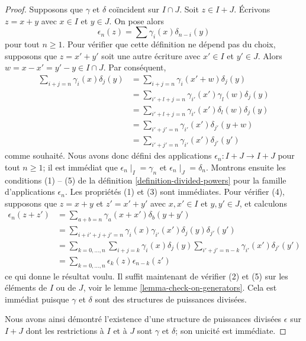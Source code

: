 \begin{proof}
\medskip\noindent
Supposons que $\gamma$ et $\delta$ coïncident sur $I \cap J$.
Soit $z \in I + J$. Écrivons $z = x + y$ avec $x \in I$ et $y \in J$.
On pose alors
$$
\epsilon_n(z) = \sum \gamma_i(x)\delta_{n - i}(y)
$$
pour tout $n \geq 1$.
Pour vérifier que cette définition ne dépend pas du choix, supposons que
$z = x' + y'$ soit une autre écriture avec $x' \in I$ et $y' \in J$. Alors
$w = x - x' = y' - y \in I \cap J$. Par conséquent,
\begin{align*}
\sum\nolimits_{i + j = n} \gamma_i(x)\delta_j(y)
& =
\sum\nolimits_{i + j = n} \gamma_i(x' + w)\delta_j(y) \\
& =
\sum\nolimits_{i' + l + j = n} \gamma_{i'}(x')\gamma_l(w)\delta_j(y) \\
& =
\sum\nolimits_{i' + l + j = n} \gamma_{i'}(x')\delta_l(w)\delta_j(y) \\
& =
\sum\nolimits_{i' + j' = n} \gamma_{i'}(x')\delta_{j'}(y + w) \\
& =
\sum\nolimits_{i' + j' = n} \gamma_{i'}(x')\delta_{j'}(y')
\end{align*}
comme souhaité. Nous avons donc défini des applications
$\epsilon_n : I + J \to I + J$ pour tout $n \geq 1$; il est immédiat que
$\epsilon_n \mid_{I} = \gamma_n$ et
$\epsilon_n \mid_{J} = \delta_n$.
Montrons ensuite les conditions (1) -- (5) de la définition
\ref{definition-divided-powers} pour la famille d'applications $\epsilon_n$.
Les propriétés (1) et (3) sont immédiates. Pour vérifier (4), supposons
que $z = x + y$ et $z' = x' + y'$ avec $x, x' \in I$ et $y, y' \in J$,
et calculons
\begin{align*}
\epsilon_n(z + z') & =
\sum\nolimits_{a + b = n} \gamma_a(x + x')\delta_b(y + y') \\
& =
\sum\nolimits_{i + i' + j + j' = n}
\gamma_i(x) \gamma_{i'}(x')\delta_j(y)\delta_{j'}(y') \\
& =
\sum\nolimits_{k = 0, \ldots, n}
\sum\nolimits_{i+j=k} \gamma_i(x)\delta_j(y)
\sum\nolimits_{i'+j'=n-k} \gamma_{i'}(x')\delta_{j'}(y') \\
& =
\sum\nolimits_{k = 0, \ldots, n}\epsilon_k(z)\epsilon_{n-k}(z')
\end{align*}
ce qui donne le résultat voulu. Il suffit maintenant de vérifier (2) et (5)
sur les éléments de $I$ ou de $J$, voir le lemme
\ref{lemma-check-on-generators}. Cela est immédiat puisque $\gamma$ et
$\delta$ sont des structures de puissances divisées.

\medskip\noindent
Nous avons ainsi démontré l'existence d'une structure de puissances divisées
$\epsilon$ sur $I+J$ dont les restrictions à $I$ et à $J$ sont
$\gamma$ et $\delta$; son unicité est immédiate.
\end{proof}

